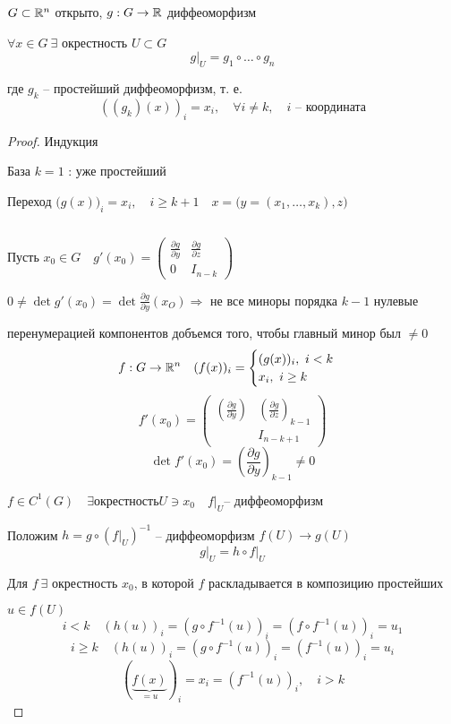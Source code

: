     \begin{lemma} %
        $G \subset \mathbb{R}^n$ открыто, $g : G \rightarrow \mathbb{R}$ диффеоморфизм
        \par $\forall x \in G \ \exists$ окрестность $U \subset G$
        \[
            g\big|_U = g_1 \circ \dots \circ g_n    
        \]
        \par где $g_k$ -- простейший диффеоморфизм, т. е.
        \[
            ((g_k)(x))_i = x_i, \quad \forall i \not= k, \quad i \text{ -- координата}  
        \]
    \end{lemma}
    \begin{proof}
        Индукция
        \par База $k=1$ : уже простейший
        \par Переход \quad $\big(g(x)\big)_i = x_i , \quad i \ge k+1 \quad x = \big(y = (x_1, \dotsc, x_k), z\big)$ %
        \par $ $
        \par Пусть $x_0 \in G \quad g'(x_0) = \begin{pmatrix}
            \frac{\partial g}{\partial y} & \frac{\partial g}{\partial z} \\
            0 & I_{n-k}
        \end{pmatrix}$
        \par $0 \not= \det g'(x_0) = \det \frac{\partial g}{\partial y} (x_O) \Rightarrow$ не все миноры порядка $k-1$ нулевые
        \par \quad перенумерацией компонентов добъемся того, чтобы главный минор был $\not= 0$
        \[
            f : G \rightarrow \mathbb{R}^n \quad (f(x))_i = \begin{cases}
                (g(x))_i, \ i < k \\
                x_i, \ i \ge k
            \end{cases}    
        \]
        \[
            f'(x_0) = \begin{pmatrix}
                \left(\frac{\partial g}{\partial y}\right) & \left(\frac{\partial g}{\partial z}\right)_{k-1} \\
                & I_{n-k+1}
            \end{pmatrix}    
        \]
        \[
            \det f'(x_0) = \left(\frac{\partial g}{\partial y}\right)_{k-1} \not= 0    
        \]

        \par $f \in C^1(G) \quad \exists окрестность U \ni x_0 \quad f\big|_{U} \text{-- диффеоморфизм}$
        \par Положим $h = g \circ (f\big|_{U})^{-1}$ -- диффеоморфизм $f(U) \rightarrow g(U)$
        \[
            g\big|_U = h \circ f\big|_U
        \]
        \par Для $f \ \exists$ окрестность $x_0$, в которой $f$ раскладывается в композицию простейших
        \par $u \in f(U)$
        \[
            i < k \quad (h(u))_i = (g \circ f^{-1}(u))_i = (f \circ f^{-1}(u))_i = u_1
        \]
        \[
            i \ge k \quad (h(u))_i = (g \circ f^{-1}(u))_i = (f^{-1}(u))_i = u_i    
        \]
        \[
            (\underbrace{f(x)}_{=u})_i = x_i = (f^{-1}(u))_i, \quad i > k    
        \]
    \end{proof}

